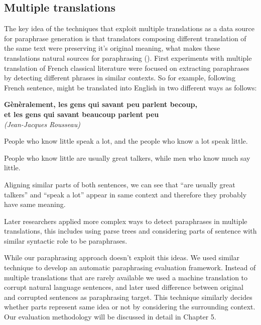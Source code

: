 \subsection{Multiple translations}

The key idea of the techniques that exploit multiple translations as a data source for paraphrase generation is that translators composing different translation of the same text were preserving it's original meaning, what makes these translations natural sources for paraphrasing (). First experiments with multiple translation of French classical literature were focused on extracting paraphrases by detecting different phrases in similar contexts. So for example, following French sentence, might be translated into English in two different ways as follows:

\begin{center}
\begin{Large}
\textbf{G\`{e}n\`{e}ralement, les gens qui savant peu parlent becoup,\\ et les gens qui savant beaucoup parlent peu}
\\
\small{\textit{(Jean-Jacques Rousseau)}}
\end{Large}
\end{center}

\begin{center}
\begin{Large}
People who know little speak a lot, and the people who know a lot speak little. 
\end{Large}
\end{center}

\begin{center}
\begin{Large}
People who know little are usually great talkers, while men who know much say little.
\end{Large}
\end{center}

Aligning similar parts of both sentences, we can see that ``are usually great talkers'' and ``speak a lot'' appear in same context and therefore they probably have same meaning.

Later researchers applied more complex ways to detect paraphrases in multiple translations, this includes using parse trees and considering parts of sentence with similar syntactic role to be paraphrases.

While our paraphrasing approach doesn't exploit this ideas. We used similar technique to develop an automatic paraphrasing evaluation framework. Instead of multiple translations that are rarely available we used a machine translation to corrupt natural language sentences, and later used difference between original and corrupted sentences as paraphrasing target. This technique similarly decides whether parts represent same idea or not by considering the surrounding context. Our evaluation methodology will be discussed in detail in Chapter 5.

